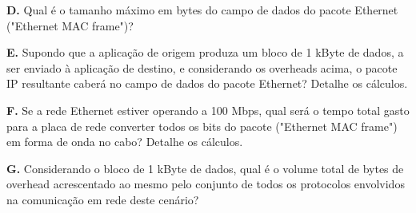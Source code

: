 \textbf{D.} Qual é o tamanho máximo em bytes do campo de dados do pacote Ethernet
("Ethernet MAC frame")?
 
\textbf{E.} Supondo que a aplicação de origem produza um bloco de 1 kByte de dados, a ser
enviado à aplicação de destino, e considerando os overheads acima, o pacote IP
resultante caberá no campo de dados do pacote Ethernet? Detalhe os cálculos.

\textbf{F.} Se a rede Ethernet estiver operando a 100 Mbps, qual será o tempo total gasto
para a placa de rede converter todos os bits do pacote ("Ethernet MAC frame") em
forma de onda no cabo? Detalhe os cálculos.

\textbf{G.} Considerando o bloco de 1 kByte de dados, qual é o volume total de bytes de
overhead acrescentado ao mesmo pelo conjunto de todos os protocolos envolvidos
na comunicação em rede deste cenário?  
